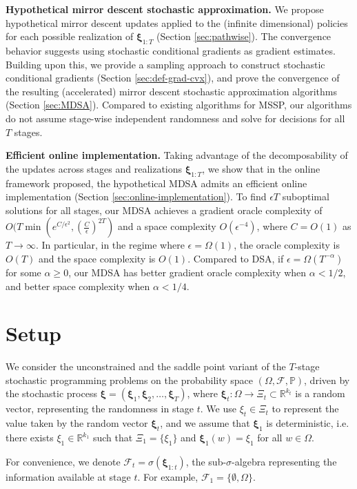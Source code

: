 \documentclass[11pt,fullpage,letterpaper]{article}
\newcommand{\mc}{\mathcal}
\newcommand{\R}{\mathbb{R}}
\newcommand{\p}{\mathbb{P}}
\newcommand{\bx}{\boldsymbol{\xi}}
\begin{document}
\textbf{Hypothetical mirror descent stochastic approximation.} We propose hypothetical mirror descent updates applied to the (infinite dimensional) policies for each possible realization of $\bx_{1:T}$ (Section \ref{sec:pathwise}). The convergence behavior suggests using stochastic conditional gradients as gradient estimates. Building upon this, we provide a sampling approach to construct stochastic conditional gradients (Section \ref{sec:def-grad-cvx}), and prove the convergence of the resulting (accelerated) mirror descent stochastic approximation algorithms (Section \ref{sec:MDSA}). Compared to existing algorithms for MSSP, our algorithms do not assume stage-wise independent randomness and solve for decisions for all $T$ stages.

\textbf{Efficient online implementation.} Taking advantage of the decomposability of the updates across stages and realizations $\bx_{1:T}$, we show that in the online framework proposed, the hypothetical MDSA admits an efficient online implementation (Section \ref{sec:online-implementation}). To find $\epsilon T$ suboptimal solutions for all stages, our MDSA achieves a gradient oracle complexity of $O(T\min(e^{C/\epsilon^2},(\frac{C}{\epsilon})^{2T})$ and a space complexity $O(\epsilon^{-4})$, where $C = O(1)$ as $T\to \infty$. In particular, in the regime where $\epsilon = \Omega(1)$, the oracle complexity is $O(T)$ and the space complexity is $O(1)$. Compared to DSA, if $\epsilon=\Omega(T^{-\alpha})$ for some $\alpha\geq 0$, our MDSA has better gradient oracle complexity when $\alpha<1/2$, and better space complexity when $\alpha<1/4$.



\section{Setup}\label{sec:setup}
We consider the unconstrained and the saddle point variant of the $T$-stage stochastic programming problems on the probability space $(\Omega,\mc F, \p)$, driven by the stochastic process $\bx = (\bx_1,\bx_2,\ldots,\bx_T)$, where $\bx_t:\Omega\to \Xi_t\subset \R^{k_t}$ is a random vector, representing the randomness in stage $t$. We use $\xi_t\in \Xi_t$ to represent the value taken by the random vector $\bx_t$, and we assume that $\bx_1$ is deterministic, i.e. there exists $\xi_1\in \R^{k_1}$ such that $\Xi_1  =\{\xi_1\}$ and $\bx_1(w) = \xi_1$ for all $w\in \Omega$. 

For convenience, we denote $\mc F_t = \sigma(\bx_{1:t})$, the sub-$\sigma$-algebra representing the information available at stage $t$. For example, $\mc F_1 = \{\emptyset,\Omega\}$. 
\end{document}
